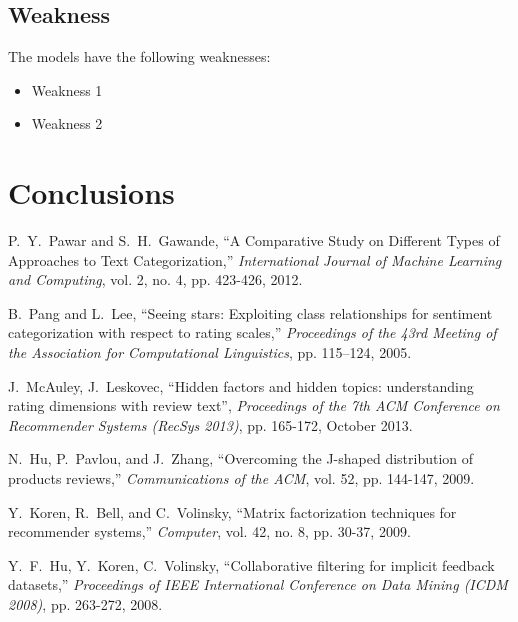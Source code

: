 \documentclass[12pt,a4paper]{article}
\begin{document}
\begin{spacing}{1.2}
\subsection{Weakness}

The models have the following weaknesses:

\begin{itemize}
\item Weakness 1

\item Weakness 2
\end{itemize}


\section{Conclusions}
\label{Conclusions}






\newpage
\begin{thebibliography}{00}


P.~Y.~Pawar and S.~H.~Gawande, ``A Comparative Study on Different Types of Approaches to Text Categorization,'' \textit{International Journal of Machine Learning and Computing}, vol. 2, no. 4, pp. 423-426, 2012.

B.~Pang and L.~Lee, ``Seeing stars: Exploiting class relationships for sentiment categorization with respect to rating scales,'' \textit{Proceedings of the 43rd Meeting of the Association for Computational Linguistics}, pp. 115–124, 2005.

J.~McAuley, J.~Leskovec, ``Hidden factors and hidden topics: understanding rating dimensions with review text'', \textit{Proceedings of the 7th ACM Conference on Recommender Systems (RecSys 2013)}, pp. 165-172, October 2013.

N.~Hu, P.~Pavlou, and J.~Zhang, ``Overcoming the J-shaped distribution of products reviews,'' \textit{Communications of the ACM}, vol. 52, pp. 144-147, 2009. 

Y.~Koren, R.~Bell, and C.~Volinsky, ``Matrix factorization techniques for recommender systems,'' \textit{Computer}, vol. 42, no. 8, pp. 30-37, 2009.

Y.~F.~Hu, Y.~Koren, C.~Volinsky, ``Collaborative filtering for implicit feedback datasets,'' \textit{Proceedings of IEEE International Conference on Data Mining (ICDM 2008)}, pp. 263-272, 2008.


\end{thebibliography}
\end{spacing}
\end{document}
